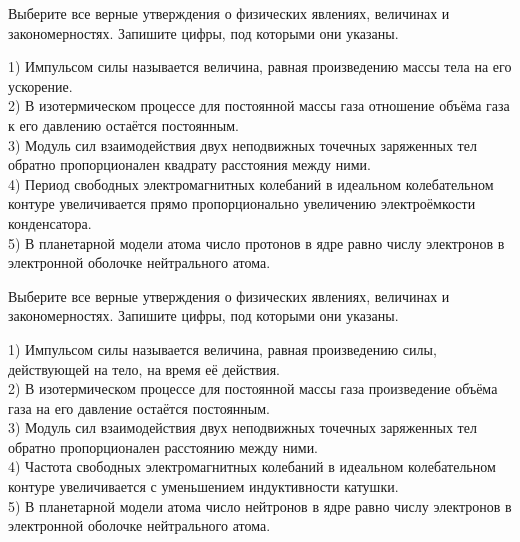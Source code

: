 \begin{taskbasic}[code={\label{task:kim18_img5}}]
Выберите все верные утверждения о физических явлениях, величинах и закономерностях. Запишите цифры, под которыми они указаны.

1) Импульсом силы называется величина, равная произведению массы тела на его ускорение.\\
2) В изотермическом процессе для постоянной массы газа отношение объёма газа к его давлению остаётся постоянным.\\
3) Модуль сил взаимодействия двух неподвижных точечных заряженных тел обратно пропорционален квадрату расстояния между ними.\\
4) Период свободных электромагнитных колебаний в идеальном колебательном контуре увеличивается прямо пропорционально увеличению электроёмкости конденсатора.\\
5) В планетарной модели атома число протонов в ядре равно числу электронов в электронной оболочке нейтрального атома.

\end{taskbasic}

\begin{taskbasic}[code={\label{task:kim18_img6}}]
Выберите все верные утверждения о физических явлениях, величинах и закономерностях. Запишите цифры, под которыми они указаны.

1) Импульсом силы называется величина, равная произведению силы, действующей на тело, на время её действия.\\
2) В изотермическом процессе для постоянной массы газа произведение объёма газа на его давление остаётся постоянным.\\
3) Модуль сил взаимодействия двух неподвижных точечных заряженных тел обратно пропорционален расстоянию между ними.\\
4) Частота свободных электромагнитных колебаний в идеальном колебательном контуре увеличивается с уменьшением индуктивности катушки.\\
5) В планетарной модели атома число нейтронов в ядре равно числу электронов в электронной оболочке нейтрального атома.

\end{taskbasic}

